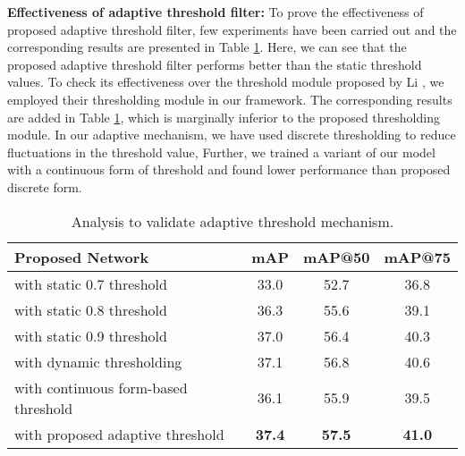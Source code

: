\documentclass[10pt,twocolumn,letterpaper]{article}
\begin{document}
\textbf{Effectiveness of adaptive threshold filter:} 
To prove the effectiveness of proposed adaptive threshold filter, few experiments have been carried out and 
the corresponding results are presented in Table \ref{Tab:threshold}. Here, we can see that the proposed adaptive threshold filter performs better than the static threshold values. 
To check its effectiveness over the threshold module proposed by Li \etal \cite{li2021rethinking}, we employed their thresholding module in our framework. The corresponding results are added in Table \ref{Tab:threshold}, which is marginally inferior to the proposed thresholding module. 
In our adaptive mechanism, we have used discrete thresholding to reduce fluctuations in the threshold value, Further, we trained a variant of our model with a continuous form of threshold and found lower performance than proposed discrete form.
\begin{table}[t!]
\caption{Analysis to validate adaptive threshold mechanism.}\label{Tab:threshold}
\begin{adjustbox}{width=.99\linewidth,center}
\begin{tabular}{l|ccc}
\hline
     \textbf{Proposed Network}    & \textbf{mAP} & \textbf{mAP@50} & \textbf{mAP@75} \\ \hline
 with static 0.7 threshold      & 33.0  & 52.7   & 36.8   \\
with static 0.8 threshold      & 36.3  & 55.6   & 39.1   \\
with static 0.9 threshold      & 37.0  & 56.4   & 40.3   \\
with dynamic thresholding \cite{li2021rethinking}  & 37.1  & 56.8   & 40.6    \\ \hline
with continuous form-based threshold & 36.1 & 55.9   & 39.5   \\
with proposed adaptive threshold & \textbf{37.4}  & \textbf{57.5}   & \textbf{41.0}  \\ \hline
\end{tabular}
\end{adjustbox}
\end{table}
\end{document}
